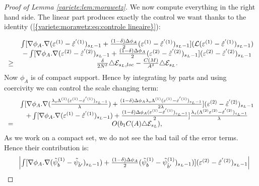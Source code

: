 \documentclass[11pt,a4paper,reqno]{amsart}
\theoremstyle{remark}
\numberwithin{equation}{section}
\begin{document}
\begin{proof}[Proof of Lemma \ref{variete:lem:morawetz}]
We now compute everything in the right hand side. The linear part produces exactly the control we want thanks to the identity {{\rm (\ref{{variete:morawetz:eq:controle lineaire}})}}:

\begin{equation} \label{variete:morawetz:eq:estimation lineaire}
\begin{array}{r c l}
&  \int [\nabla \phi_A .\nabla (\varepsilon^{(1)}-\hat{\varepsilon}^{'(1)})_{s_L-1}+\frac{(1-\delta)\Delta \phi_A}{2}(\varepsilon^{(1)}-\hat{\varepsilon}^{'(1)})_{s_L-1}] (\mathcal{L}(\varepsilon^{(1)}-\hat{\varepsilon}^{'(1)})_{s_L-1}) \\
&-\int [\nabla \phi_A .\nabla (\varepsilon^{(2)}-\hat{\varepsilon}^{'(2)})_{s_L-1}+\frac{(1-\delta)\Delta \phi_A}{2}(\varepsilon^{(2)}-\hat{\varepsilon}^{'(2)})_{s_L-1}] (\varepsilon^{(2)}-\hat{\varepsilon}^{'(2)})_{s_L-1}\\
\geq &\frac{\delta}{2N^{\delta}} \triangle \mathcal{E}_{s_L,loc} -\frac{C(M)}{A^{\delta}}\triangle \mathcal{E}_{s_L} .
\end{array}
\end{equation}
Now $\phi_A$ is of compact support. Hence by integrating by parts and using coercivity we can control the scale changing term:
\begin{equation} \label{variete:morawetz:eq:estimation lambdavarepsilon}
\begin{array}{r c l}
&\int [\nabla \phi_A .\nabla(\frac{\lambda_s\Lambda^{(1)}(\varepsilon^{(1)}-\hat{\varepsilon}^{'(1)})_{s_L-1}}{\lambda})+\frac{(1-\delta)\Delta \phi_A\lambda_s \Lambda^{(1)}(\varepsilon^{(1)}-\hat{\varepsilon}^{'(1)})_{s_L-1}}{2\lambda}](\varepsilon^{(2)}-\hat{\varepsilon}^{'(2)})_{s_L-1} \\
&+\int [\nabla \phi_A. \nabla(\varepsilon^{(1)}-\hat{\varepsilon}^{'(1)})_{s_L-1})+\frac{(1-\delta)\Delta \phi_A(\varepsilon^{(1)}-\hat{\varepsilon}^{'(1)})_{s_L-1}}{2}]\frac{\lambda_s(\Lambda^{(2)}\varepsilon^{(2)}-\hat{\varepsilon}^{'(2)})_{s_L-1}}{\lambda} \\
= & O(b_1 C(A) \triangle \mathcal{E}_{s_L}) ,
\end{array}
\end{equation}
As we work on a compact set, we do not see the bad tail of the error terms. Hence their contribution is:
\begin{equation} \label{variete:morawetz:eq:estimation psib}
\begin{array}{r c l}
&\left|\int [\nabla \phi_A .\nabla(\tilde{\psi}^{(1)}_b-\tilde{\psi}_{\hat{b}'})_{s_L-1})+\frac{(1-\delta)\Delta \phi_A}{2}(\tilde{\psi}^{(1)}_b-\tilde{\psi}_{\hat{b}'}^{(1)})_{s_L-1})](\varepsilon^{(2)}-\hat{\varepsilon}^{'(2)})_{s_L-1}\right| \\

\end{array}
\end{equation}
\end{proof}
\end{document}
